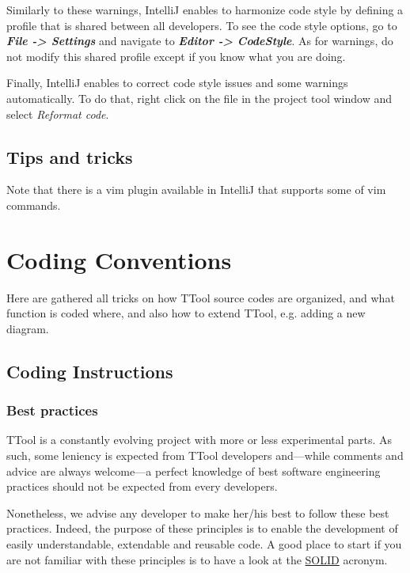 \documentclass[12pt]{article}
\begin{document}
Similarly to these warnings, IntelliJ enables to harmonize code style by
defining a profile that is shared between all developers. To see the code style
options, go to \textbf{\emph{File -> Settings}} and navigate to
 \textbf{\emph{Editor -> CodeStyle}}. 
As for warnings, do not modify this shared profile except if you know
what you are doing.

Finally, IntelliJ enables to correct code style issues and some warnings
automatically. To do that, right click on the file in the project tool window
and select \emph{Reformat code}.

\subsection{Tips and tricks}

Note that there is a vim plugin available in IntelliJ that supports some of vim
commands.

\newpage 

\section{Coding Conventions}
Here are gathered all tricks on how TTool source codes are organized, and what function is coded where, and also how to extend TTool, e.g. adding a new diagram.

\subsection{Coding Instructions}
\label{sec:code_info}
\subsubsection{Best practices}

TTool is a constantly evolving project with more or less experimental parts. As
such, some leniency is expected from TTool developers and---while comments and
advice are always welcome---a perfect knowledge of best software engineering
practices should not be expected from every developers.

Nonetheless, we advise any developer to make her/his best to follow these best
practices. Indeed, the purpose of these principles is to enable the development
of easily understandable, extendable and reusable code. A good place to start if
you are not familiar with these principles is to have a look at the
\href{https://en.wikipedia.org/wiki/SOLID_(object-oriented_design)}{SOLID}
acronym.
\end{document}

